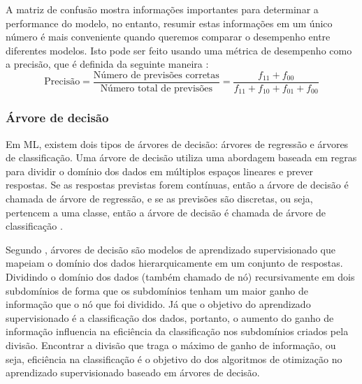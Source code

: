 A matriz de confusão mostra informações importantes para determinar a
performance do modelo, no entanto, resumir estas informações em um único número
é mais conveniente quando queremos comparar o desempenho entre  diferentes
modelos. Isto pode ser feito usando uma métrica de desempenho como a precisão,
que é definida da seguinte maneira \cite{tan2009introduccao}:
\[
  \text{Precisão} =
  \frac
    {\text{Número de previsões corretas}}
    {\text{Número total de previsões}} =
  \frac
    {f_{11} + f_{00}}
    {f_{11} + f_{10} + f_{01} + f_{00}}
\]

\subsubsection{Árvore de decisão}

Em ML, existem dois tipos de árvores de decisão: árvores de regressão e árvores
de classificação. Uma árvore de decisão utiliza uma abordagem baseada em regras
para dividir o domínio dos dados em múltiplos espaços lineares e prever
respostas. Se as respostas previstas forem contínuas, então a árvore de decisão
é chamada de árvore de regressão, e se as previsões são discretas, ou seja,
pertencem a uma classe, então a árvore de decisão é chamada de árvore de
classificação \cite{suthaharan2016machine}.

Segundo , árvores de decisão são modelos de
aprendizado supervisionado que mapeiam o domínio dos dados hierarquicamente em
um conjunto de respostas. Dividindo o domínio dos dados (também chamado de nó)
recursivamente em dois subdomínios de forma que os subdomínios tenham um maior
ganho de informação que o nó que foi dividido. Já que o objetivo do aprendizado
supervisionado é a classificação dos dados, portanto,  o aumento do ganho de
informação influencia na eficiência da classificação nos subdomínios criados
pela divisão. Encontrar a divisão que traga o máximo de ganho de informação, ou
seja, eficiência na classificação é o objetivo do dos algoritmos de otimização
no aprendizado supervisionado baseado em árvores de decisão.

